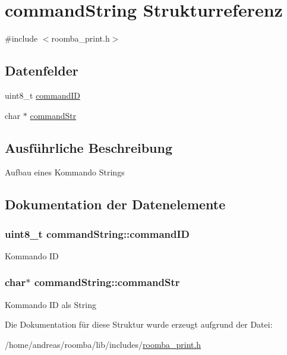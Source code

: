 \hypertarget{structcommandString}{\section{command\-String Strukturreferenz}
\label{structcommandString}
}


{\ttfamily \#include $<$roomba\-\_\-print.\-h$>$}

\subsection*{Datenfelder}
\begin{DoxyCompactItemize}
\item 
uint8\-\_\-t \hyperlink{structcommandString_a10aec94c808d709abf7ce7ca5419bf61}{command\-I\-D}
\item 
char $\ast$ \hyperlink{structcommandString_a38a360f6bfcbd47a0f620a9625521450}{command\-Str}
\end{DoxyCompactItemize}


\subsection{Ausführliche Beschreibung}
Aufbau eines Kommando Strings 

\subsection{Dokumentation der Datenelemente}
\hypertarget{structcommandString_a10aec94c808d709abf7ce7ca5419bf61}{
\subsubsection[{command\-I\-D}]{\setlength{\rightskip}{0pt plus 5cm}uint8\-\_\-t command\-String\-::command\-I\-D}}\label{structcommandString_a10aec94c808d709abf7ce7ca5419bf61}
Kommando I\-D \hypertarget{structcommandString_a38a360f6bfcbd47a0f620a9625521450}{
\subsubsection[{command\-Str}]{\setlength{\rightskip}{0pt plus 5cm}char$\ast$ command\-String\-::command\-Str}}\label{structcommandString_a38a360f6bfcbd47a0f620a9625521450}
Kommando I\-D als String 

Die Dokumentation für diese Struktur wurde erzeugt aufgrund der Datei\-:\begin{DoxyCompactItemize}
\item 
/home/andreas/roomba/lib/includes/\hyperlink{roomba__print_8h}{roomba\-\_\-print.\-h}\end{DoxyCompactItemize}
